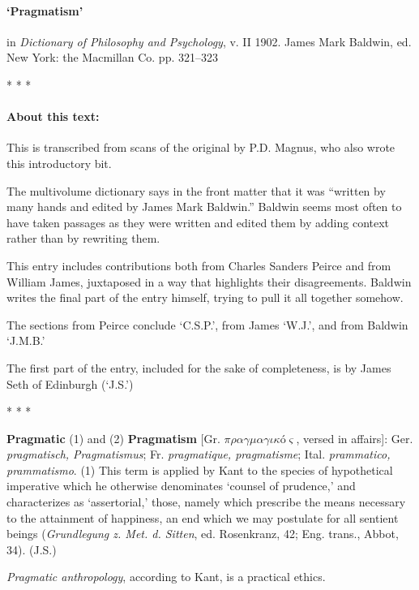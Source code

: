 \documentclass{article}
\newcommand{\spacer}{\medskip\centerline{* * *}\medskip}
\begin{document}
\paragraph{`Pragmatism'} in \emph{Dictionary of Philosophy and Psychology}, v. II 1902. James Mark Baldwin, ed. New York: the Macmillan Co. pp. 321--323

\spacer

\paragraph{About this text:} This is transcribed from scans of the original by P.D. Magnus, who also wrote this introductory bit.

The multivolume dictionary says in the front matter that it was ``written by many hands and edited by James Mark Baldwin.'' Baldwin seems most often to have taken passages as they were written and edited them by adding context rather than by rewriting them.

This entry includes contributions both from Charles Sanders Peirce and from William James, juxtaposed in a way that highlights their disagreements. Baldwin writes the final part of the entry himself, trying to pull it all together somehow.

The sections from Peirce conclude `C.S.P.', from James `W.J.', and from Baldwin `J.M.B.'

The first part of the entry, included for the sake of completeness, is by James Seth of Edinburgh (`J.S.')


\spacer







\textbf{Pragmatic} (1) and (2) \textbf{Pragmatism} [Gr. $\pi\rho\alpha\gamma\mu\alpha\gamma\iota\kappa$\'{o}$\varsigma$, versed in affairs]: Ger. \textit{pragmatisch, Pragmatismus}; Fr. \textit{pragmatique, pragmatisme}; Ital. \textit{prammatico, prammatismo}. (1) This term is applied by Kant to the species of hypothetical imperative which he otherwise denominates `counsel of prudence,' and characterizes as `assertorial,' those, namely which prescribe the means necessary to the attainment of happiness, an end which we may postulate for all sentient beings (\textit{Grundlegung z. Met. d. Sitten}, ed. Rosenkranz, 42; Eng. trans., Abbot, 34). \hfill (J.S.)

\textit{Pragmatic anthropology}, according to Kant, is a practical ethics.
\end{document}
